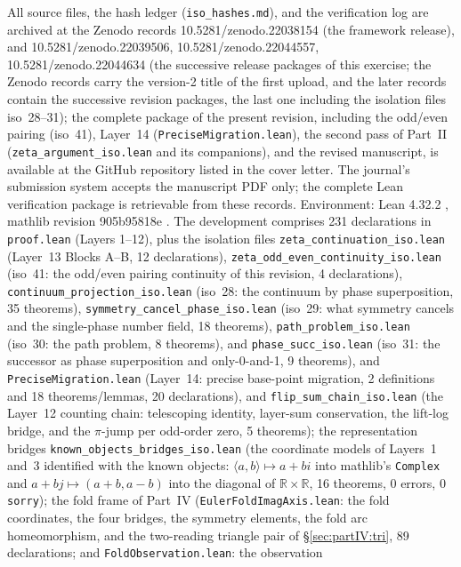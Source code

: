 \documentclass{article}
\begin{document}
All source files, the hash ledger (\texttt{iso\_hashes.md}), and the
verification log are archived at the Zenodo records
10.5281/zenodo.22038154 (the framework release), and
10.5281/zenodo.22039506, 10.5281/zenodo.22044557,
10.5281/zenodo.22044634 (the successive release packages of this
exercise; the Zenodo records carry the version-2 title of the first
upload, and the later records contain the successive revision
packages, the last one including the isolation files iso~28--31); the
complete package of the
present revision, including the odd/even pairing (iso~41), Layer~14
(\texttt{PreciseMigration.lean}), the second pass of Part~II
(\texttt{zeta\_argument\_iso.lean} and its companions), and the revised
manuscript, is available at the GitHub repository listed in the cover
letter. The
journal's submission system accepts the manuscript PDF only; the
complete Lean verification package is retrievable from these records.
Environment: Lean 4.32.2 \cite{lean}, mathlib revision 905b95818e
\cite{mathlib}. The development
comprises 231 declarations in \texttt{proof.lean} (Layers 1--12), plus the
isolation files \texttt{zeta\_continuation\_iso.lean} (Layer~13 Blocks A--B,
12 declarations), \texttt{zeta\_odd\_even\_continuity\_iso.lean} (iso~41:
the odd/even pairing continuity of this revision, 4 declarations),
\texttt{continuum\_projection\_iso.lean}
(iso~28: the continuum by phase superposition, 35 theorems),
\texttt{symmetry\_cancel\_phase\_iso.lean} (iso~29: what symmetry cancels
and the single-phase number field, 18 theorems),
\texttt{path\_problem\_iso.lean} (iso~30: the path problem, 8
theorems), and \texttt{phase\_succ\_iso.lean} (iso~31: the
successor as phase superposition and only-0-and-1, 9 theorems),
and \texttt{PreciseMigration.lean} (Layer~14: precise base-point
migration, 2 definitions and 18 theorems/lemmas, 20 declarations),
and \texttt{flip\_sum\_chain\_iso.lean} (the Layer~12 counting chain:
telescoping identity, layer-sum conservation, the lift-log bridge, and
the $\pi$-jump per odd-order zero, 5 theorems);
the representation bridges \texttt{known\_objects\_bridges\_iso.lean}
(the coordinate models of Layers~1 and~3 identified with the known
objects: $\langle a,b\rangle\mapsto a+bi$ into mathlib's
\texttt{Complex} and $a+bj\mapsto(a+b,a-b)$ into the diagonal of
$\mathbb R\times\mathbb R$, 16 theorems, 0 errors, 0
\texttt{sorry});
the fold frame of Part~IV
(\texttt{EulerFoldImagAxis.lean}: the fold coordinates, the four
bridges, the symmetry elements, the fold arc homeomorphism, and the
two-reading triangle pair of \S\ref{sec:partIV:tri}, 89
declarations; and \texttt{FoldObservation.lean}: the observation
\end{document}
